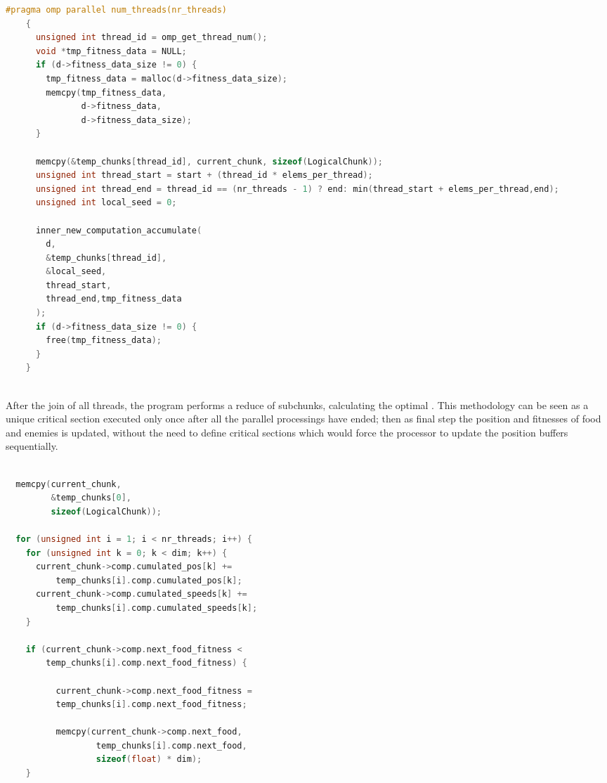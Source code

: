 \documentclass[10pt]{article}
\begin{document}
\begin{multicols}{2}
\begin{lstlisting}[language=C,caption={the parallel version of \textit{computation\_accumulate}}]
  #pragma omp parallel num_threads(nr_threads)
    {
      unsigned int thread_id = omp_get_thread_num();
      void *tmp_fitness_data = NULL;
      if (d->fitness_data_size != 0) {
        tmp_fitness_data = malloc(d->fitness_data_size);
        memcpy(tmp_fitness_data, 
               d->fitness_data, 
               d->fitness_data_size);
      }

      memcpy(&temp_chunks[thread_id], current_chunk, sizeof(LogicalChunk));
      unsigned int thread_start = start + (thread_id * elems_per_thread);
      unsigned int thread_end = thread_id == (nr_threads - 1) ? end: min(thread_start + elems_per_thread,end);
      unsigned int local_seed = 0;
      
      inner_new_computation_accumulate(
        d,
        &temp_chunks[thread_id],
        &local_seed,
        thread_start, 
        thread_end,tmp_fitness_data
      );
      if (d->fitness_data_size != 0) {
        free(tmp_fitness_data);
      }
    }
  
 \end{lstlisting}
 After the join of all threads, the program performs a reduce of subchunks, calculating
the optimal . This methodology can be seen as a unique critical section
executed only once after all the parallel processings have ended; then as final step the position and fitnesses
of food and enemies is updated, without the need to define critical sections which would force the processor 
to update the position buffers sequentially.

\begin{lstlisting}[language=C,caption={the parallel version of \textit{computation\_accumulate}}]

  memcpy(current_chunk, 
         &temp_chunks[0], 
         sizeof(LogicalChunk));

  for (unsigned int i = 1; i < nr_threads; i++) {
    for (unsigned int k = 0; k < dim; k++) {
      current_chunk->comp.cumulated_pos[k] +=
          temp_chunks[i].comp.cumulated_pos[k];
      current_chunk->comp.cumulated_speeds[k] +=
          temp_chunks[i].comp.cumulated_speeds[k];
    }

    if (current_chunk->comp.next_food_fitness <
        temp_chunks[i].comp.next_food_fitness) {

          current_chunk->comp.next_food_fitness =
          temp_chunks[i].comp.next_food_fitness;

          memcpy(current_chunk->comp.next_food, 
                  temp_chunks[i].comp.next_food,
                  sizeof(float) * dim);
    }


\end{lstlisting}
\end{multicols}
\end{document}
